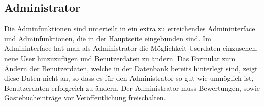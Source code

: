 \documentclass[10pt,a4paper]{scrartcl}
\begin{document}
\subsection{Administrator}
Die Adminfunktionen sind unterteilt in ein extra zu erreichendes Admininterface und Adminfunktionen, die in der Hauptseite eingebunden sind. Im Admininterface hat man als Administrator die Möglichkeit Userdaten einzusehen, neue User hinzuzufügen und Benutzerdaten zu ändern. Das Formular zum Ändern der Benutzerdaten, welche in der Datenbank bereits hinterlegt sind, zeigt diese Daten nicht an, so dass es für den Administrator so gut wie unmöglich ist, Benutzerdaten erfolgreich zu ändern. Der Administrator muss Bewertungen, sowie Gästebucheinträge vor Veröffentlichung freischalten. 
\end{document}
